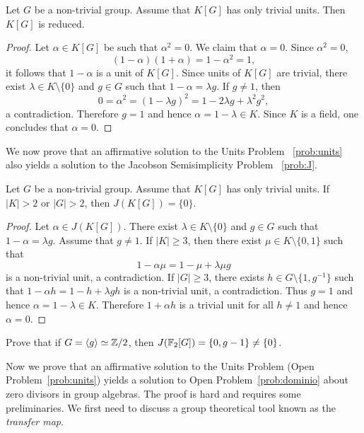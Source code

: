 \begin{theorem}
	Let $G$ be a non-trivial group. Assume that $K[G]$ has only trivial units.
	Then $K[G]$ is reduced. 
\end{theorem}

\begin{proof}
	Let $\alpha\in K[G]$ be such that $\alpha^2=0$. We claim that 
	$\alpha=0$. Since $\alpha^2=0$, 
	\[
		(1-\alpha)(1+\alpha)=1-\alpha^2=1, 
	\]
	it follows that $1-\alpha$ is a unit of $K[G]$. Since units of $K[G]$ are 
	trivial, there exist $\lambda\in K\setminus\{0\}$ and $g\in G$ such that 
	$1-\alpha=\lambda g$. If $g\ne 1$, then 
	\[
		0=\alpha^2=(1-\lambda g)^2=1-2\lambda g+\lambda^2g^2,
	\]
	a contradiction. Therefore $g=1$ and hence $\alpha=1-\lambda\in K$. Since
	$K$ is a field, one concludes that $\alpha=0$.
\end{proof}

We now prove that an affirmative solution to the Units Problem
~\ref{prob:units} also yields a solution to the Jacobson Semisimplicity Problem
~\ref{prob:J}. 

\begin{theorem}
	Let $G$ be a non-trivial group. Assume that $K[G]$ has only trivial units. 
	If $|K|>2$ or $|G|>2$, then $J(K[G])=\{0\}$.
\end{theorem}

\begin{proof}
	Let $\alpha\in J(K[G])$. There exist $\lambda\in K\setminus\{0\}$ and $g\in
	G$ such that $1-\alpha=\lambda g$. Assume that $g\ne 1$.  If $|K|\geq3$,
	then there exist $\mu\in K\setminus\{0,1\}$ such that
	\[
		1-\alpha\mu=1-\mu+\lambda\mu g 
	\]
	is a non-trivial unit, a contradiction.
	If $|G|\geq3$, there exists $h\in G\setminus\{1,g^{-1}\}$ such that
	$1-\alpha h=1-h+\lambda gh$ is a non-trivial unit, a contradiction.  Thus
	$g=1$ and hence $\alpha=1-\lambda\in K$. Therefore $1+\alpha h$ is a
	trivial unit for all $h\ne 1$ and hence 	$\alpha=0$.
\end{proof}

\begin{exercise}
	Prove that if $G=\langle g\rangle\simeq\mathbb{Z}/2$, then 
	$J(\mathbb{F}_2[G])=\{0,g-1\}\ne\{0\}$. 
\end{exercise}


Now we prove that an affirmative solution 
to the Units Problem 
(Open Problem~\ref{prob:units}) 
yields a solution to 
Open Problem~\ref{prob:dominio} about zero divisors in group algebras.
The proof is hard and requires some preliminaries. We first need
to discuss a group theoretical tool known as the \emph{transfer map}. 

